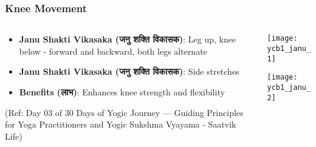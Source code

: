 \begin{frame}[fragile]\frametitle{Knee Movement}
\begin{columns}
    \begin{column}[T]{0.5\linewidth}
      \begin{itemize}
		\item \textbf{Janu Shakti Vikasaka (जनु शक्ति विकासक)}: Leg up, knee below - forward and backward, both legs alternate
		\item \textbf{Janu Shakti Vikasaka (जनु शक्ति विकासक)}: Side stretches
		\item \textbf{Benefits (लाभ)}: Enhances knee strength and flexibility
	  \end{itemize}
	  
	  		{\tiny (Ref: Day 03 of 30 Days of Yogic Journey — Guiding Principles for Yoga Practitioners and Yogic Sukshma Vyayama - Saatvik Life)}	
    \end{column}
    \begin{column}[T]{0.5\linewidth}
		\begin{center}
		\texttt{[image: ycb1\_janu\_1]}
		
		\texttt{[image: ycb1\_janu\_2]}

		\end{center}	
    \end{column}
\end{columns}
\end{frame}

